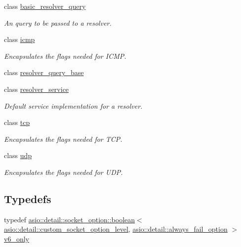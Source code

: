 \begin{DoxyCompactItemize}
class \hyperlink{classasio_1_1ip_1_1basic__resolver__query}{basic\+\_\+resolver\+\_\+query}
\begin{DoxyCompactList}\small\item\em An query to be passed to a resolver. \end{DoxyCompactList}\item 
class \hyperlink{classasio_1_1ip_1_1icmp}{icmp}
\begin{DoxyCompactList}\small\item\em Encapsulates the flags needed for I\+C\+M\+P. \end{DoxyCompactList}\item 
class \hyperlink{classasio_1_1ip_1_1resolver__query__base}{resolver\+\_\+query\+\_\+base}
\item 
class \hyperlink{classasio_1_1ip_1_1resolver__service}{resolver\+\_\+service}
\begin{DoxyCompactList}\small\item\em Default service implementation for a resolver. \end{DoxyCompactList}\item 
class \hyperlink{classasio_1_1ip_1_1tcp}{tcp}
\begin{DoxyCompactList}\small\item\em Encapsulates the flags needed for T\+C\+P. \end{DoxyCompactList}\item 
class \hyperlink{classasio_1_1ip_1_1udp}{udp}
\begin{DoxyCompactList}\small\item\em Encapsulates the flags needed for U\+D\+P. \end{DoxyCompactList}\end{DoxyCompactItemize}
\subsection*{Typedefs}
\begin{DoxyCompactItemize}
\item 
typedef \hyperlink{classasio_1_1detail_1_1socket__option_1_1boolean}{asio\+::detail\+::socket\+\_\+option\+::boolean}$<$ \hyperlink{namespaceasio_1_1detail_ac87c0ec12e7071c1f18513b04a627a24}{asio\+::detail\+::custom\+\_\+socket\+\_\+option\+\_\+level}, \hyperlink{namespaceasio_1_1detail_a9a0de25b02f8e9540fe34ccad54988a3}{asio\+::detail\+::always\+\_\+fail\+\_\+option} $>$ \hyperlink{namespaceasio_1_1ip_a4f0248e26261c7f45cde7360fb5e127c}{v6\+\_\+only}
\end{DoxyCompactItemize}
